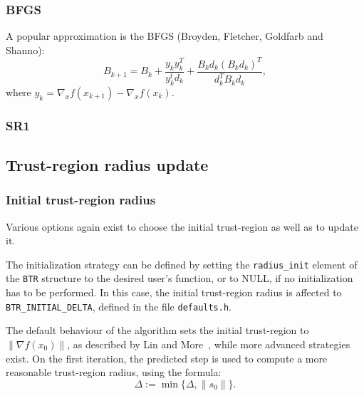 \subsubsection{BFGS}

A popular approximation is the BFGS (Broyden, Fletcher,
Goldfarb and Shanno):
\[
B_{k+1} = B_k + \frac{y_k y_k^T}{y_k^td_k} + \frac{B_kd_k
  (B_kd_k)^T}{d_k^TB_kd_k},
\]
where $y_k = \nabla_x f(x_{k+1}) - \nabla_x f(x_k)$.

\subsubsection{SR1}


\subsection{Trust-region radius update}

\subsubsection{Initial trust-region radius}

Various options again exist to choose the initial trust-region as well
as to update it.

The initialization strategy can be defined by setting the
\verb|radius_init| element of the \verb|BTR| structure to the
desired user's function, or to NULL, if no initialization has to be
performed.
In this case, the initial trust-region radius is affected to
\verb|BTR_INITIAL_DELTA|, defined in the file \verb|defaults.h|.

The default behaviour of the algorithm sets the initial trust-region
to $\|\nabla f(x_0)\|$, as described by Lin and More~\cite{LinMore99},
while more advanced strategies exist. On the first iteration, the
predicted step is used to compute a more reasonable trust-region
radius, using the formula:
\[
\Delta := \min \lbrace \Delta, \| s_0 \| \rbrace.
\]

